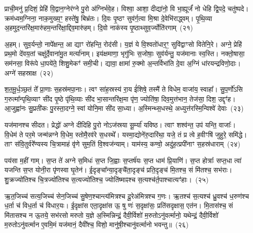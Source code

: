 {\anuvakamend[{दी॒या॒ दा॒यो ज॑यन्त्व॒मित्रा॒न्प्र च॑त्वारि॒ꣳ॒शच्च॑}]}%

प्राची॒मनु॑ प्र॒दिशं॒ प्रेहि॑ वि॒द्वान॒ग्नेर॑ग्ने पु॒रो अ॑ग्निर्भवे॒ह। विश्वा॒ आशा॒ दीद्या॑नो॒ वि भा॒ह्यूर्जं॑ नो धेहि द्वि॒पदे॒ चतु॑ष्पदे। क्रम॑ध्वम॒ग्निना॒ नाक॒मुख्य॒ꣳ॒ हस्ते॑षु॒ बिभ्र॑तः। दि॒वः पृ॒ष्ठꣳ सुव॑र्ग॒त्वा मि॒श्रा दे॒वेभि॑राद्ध्वम्। पृ॒थि॒व्या अ॒हमुद॒न्तरि॑क्ष॒मारु॑हम॒न्तरि॑क्षा॒द्दिव॒मारु॑हम्। दि॒वो नाक॑स्य पृ॒ष्ठाथ्सुव॒र्ज्योति॑रगाम्~(२१)

अ॒हम्। सुव॒र्यन्तो॒ नापे᳚क्षन्त॒ आ द्याꣳ रो॑हन्ति॒ रोद॑सी। य॒ज्ञं ये वि॒श्वतो॑धार॒ꣳ॒ सुवि॑द्वाꣳसो वितेनि॒रे। अग्ने॒ प्रेहि॑ प्रथ॒मो दे॑वय॒तां चक्षु॑र्दे॒वाना॑\-मु॒त मर्त्या॑नाम्। इय॑क्षमाणा॒ भृगु॑भिः स॒जोषाः॒ सुव॑र्यन्तु॒ यज॑मानाः स्व॒स्ति। नक्तो॒षासा॒ सम॑नसा॒ विरू॑पे धा॒पये॑ते॒ शिशु॒मेकꣳ॑ समी॒ची। द्यावा॒ क्षामा॑ रु॒क्मो अ॒न्तर्विभा॑ति दे॒वा अ॒ग्निं धा॑रयन्द्रविणो॒दाः। अग्ने॑ सहस्राक्ष~(२२)

श॒त॒मू॒र्ध॒ञ्छ॒तं ते᳚ प्रा॒णाः स॒हस्र॑मपा॒नाः। त्वꣳ सा॑ह॒स्रस्य॑ रा॒य ई॑शिषे॒ तस्मै॑ ते विधेम॒ वाजा॑य॒ स्वाहा᳚। सु॒प॒र्णो॑\-ऽसि ग॒रुत्मा᳚न्पृथि॒व्याꣳ सी॑द पृ॒ष्ठे पृ॑थि॒व्याः सी॑द भा॒सान्तरि॑क्ष॒मा पृ॑ण॒ ज्योति॑षा॒ दिव॒मुत्त॑भान॒ तेज॑सा॒ दिश॒ उद्दृꣳ॑ह। आ॒जुह्वा॑नः सु॒प्रती॑कः पु॒रस्ता॒दग्ने॒ स्वां योनि॒मा सी॑द सा॒ध्या। अ॒स्मिन्थ्स॒धस्थे॒ अध्युत्त॑रस्मि॒न्विश्वे॑ देवाः~(२३)

यज॑मानश्च सीदत। प्रेद्धो॑ अग्ने दीदिहि पु॒रो नो\-ऽज॑स्रया सू॒र्म्या॑ यविष्ठ। त्वाꣳ शश्व॑न्त॒ उप॑ यन्ति॒ वाजाः᳚। वि॒धेम॑ ते पर॒मे जन्म॑न्नग्ने वि॒धेम॒ स्तोमै॒रव॑रे स॒धस्थे᳚। यस्मा॒द्योने॑रु॒दारि॑था॒ यजे॒ तं प्र त्वे ह॒वीꣳषि॑ जुहुरे॒ समि॑द्धे। ताꣳ स॑वि॒तुर्वरे᳚ण्यस्य चि॒त्रामाहं वृ॑णे सुम॒तिं वि॒श्वज॑न्याम्। याम॑स्य॒ कण्वो॒ अदु॑ह॒त्प्रपी॑नाꣳ स॒हस्र॑धाराम्~(२४)

पय॑सा म॒हीं गाम्। स॒प्त ते॑ अग्ने स॒मिधः॑ स॒प्त जि॒ह्वाः स॒प्तर्\mbox{}ष॑यः स॒प्त धाम॑ प्रि॒याणि॑। स॒प्त होत्राः᳚ सप्त॒धा त्वा॑ यजन्ति स॒प्त योनी॒रा पृ॑णस्वा घृ॒तेन॑। ई॒दृङ्चा᳚न्या॒दृङ्चै॑ता॒दृङ्च॑ प्रति॒दृङ्च॑ मि॒तश्च॒ सं मि॑तश्च॒ सभ॑राः। शु॒क्रज्यो॑तिश्च चि॒त्रज्यो॑तिश्च स॒त्यज्यो॑तिश्च॒ ज्योति॑ष्माꣴश्च स॒त्यश्च॑र्त॒पाश्चात्यꣳ॑हाः।~(२५)

ऋ॒त॒जिच्च॑ सत्य॒जिच्च॑ सेन॒जिच्च॑ सु॒षेण॒श्चान्त्य॑मित्रश्च दू॒रेअ॑मित्रश्च ग॒णः। ऋ॒तश्च॑ स॒त्यश्च॑ ध्रु॒वश्च॑ ध॒रुण॑श्च ध॒र्ता च॑ विध॒र्ता च॑ विधार॒यः। ई॒दृक्षा॑स एता॒दृक्षा॑स ऊ॒ षु णः॑ स॒दृक्षा॑सः॒ प्रति॑सदृक्षास॒ एत॑न। मि॒तास॑श्च॒ सं मि॑तासश्च न ऊ॒तये॒ सभ॑रसो मरुतो य॒ज्ञे अ॒स्मिन्निन्द्रं॒ दैवी॒र्विशो॑ म॒रुतो\-ऽनु॑वर्त्मानो॒ यथेन्द्रं॒ दैवी॒र्विशो॑ म॒रुतो\-ऽनु॑वर्त्मान ए॒वमि॒मं यज॑मानं॒ दैवी᳚श्च॒ विशो॒ मानु॑षी॒श्चानु॑वर्त्मानो भवन्तु॥~(२६)

